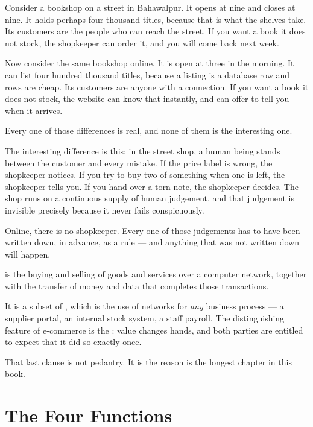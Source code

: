 Consider a bookshop on a street in Bahawalpur. It opens at nine and closes at
nine. It holds perhaps four thousand titles, because that is what the shelves
take. Its customers are the people who can reach the street. If you want a book
it does not stock, the shopkeeper can order it, and you will come back next
week.

Now consider the same bookshop online. It is open at three in the morning. It
can list four hundred thousand titles, because a listing is a database row and
rows are cheap. Its customers are anyone with a connection. If you want a book
it does not stock, the website can know that instantly, and can offer to tell
you when it arrives.

Every one of those differences is real, and none of them is the interesting one.

The interesting difference is this: in the street shop, a human being stands
between the customer and every mistake. If the price label is wrong, the
shopkeeper notices. If you try to buy two of something when one is left, the
shopkeeper tells you. If you hand over a torn note, the shopkeeper decides. The
shop runs on a continuous supply of human judgement, and that judgement is
invisible precisely because it never fails conspicuously.

Online, there is no shopkeeper. Every one of those judgements has to have been
written down, in advance, as a rule --- and anything that was not written down
will happen.

\begin{definitionbox}
 is the buying and selling of goods and services over
a computer network, together with the transfer of money and data that completes
those transactions.

\smallskip
It is a subset of , which is the use of networks for
\emph{any} business process --- a supplier portal, an internal stock system, a
staff payroll. The distinguishing feature of e-commerce is the
: value changes hands, and both parties are entitled to
expect that it did so exactly once.

\smallskip
That last clause is not pedantry. It is the reason  is the
longest chapter in this book.
\end{definitionbox}

\section{The Four Functions}

